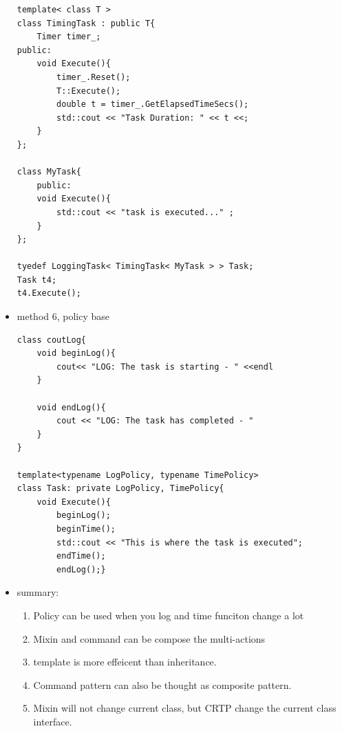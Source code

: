 \documentclass[a4paper,11pt,twoside]{book}
\begin{document}
\begin{itemize}
\begin{lstlisting}[numbers=none]
template< class T >
class TimingTask : public T{
	Timer timer_;
public:
	void Execute(){
		timer_.Reset();
		T::Execute();
		double t = timer_.GetElapsedTimeSecs();
		std::cout << "Task Duration: " << t <<;
	}
};
	
class MyTask{
	public:
	void Execute(){
		std::cout << "task is executed..." ;
	}
};
	
tyedef LoggingTask< TimingTask< MyTask > > Task;
Task t4;
t4.Execute();
\end{lstlisting}

		\item method 6, policy base
\begin{lstlisting}[numbers=none]
class coutLog{
	void beginLog(){
		cout<< "LOG: The task is starting - " <<endl
	}
	
	void endLog(){
		cout << "LOG: The task has completed - "
	}
}
	
template<typename LogPolicy, typename TimePolicy>
class Task: private LogPolicy, TimePolicy{
	void Execute(){
		beginLog();
		beginTime();
		std::cout << "This is where the task is executed";
		endTime();
		endLog();}
\end{lstlisting}
	
	\item summary:
	\begin{enumerate}
		\item Policy can be used when you log and time funciton change a lot
		\item Mixin and command can be compose the multi-actions
		\item template is more effeicent than inheritance. 
		\item Command pattern can also be thought as composite pattern.
		\item Mixin will not change current class, but CRTP change the current class interface.
	\end{enumerate}
	
\end{itemize}
\end{document}
